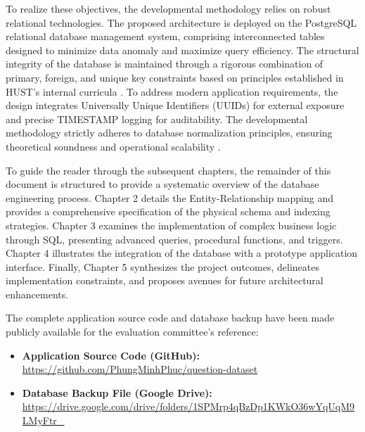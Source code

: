 \documentclass[../report_main.tex]{subfiles}
\begin{document}
To realize these objectives, the developmental methodology relies on robust relational technologies. The proposed architecture is deployed on the PostgreSQL \cite{postgresql2023} relational database management system, comprising interconnected tables designed to minimize data anomaly and maximize query efficiency. The structural integrity of the database is maintained through a rigorous combination of primary, foreign, and unique key constraints based on principles established in \gls{HUST}'s internal curricula \cite{hust_db_slides}. To address modern application requirements, the design integrates Universally Unique Identifiers (UUIDs) for external exposure and precise TIMESTAMP logging for auditability. The developmental methodology strictly adheres to database normalization principles, ensuring theoretical soundness and operational scalability \cite{uet_db_slides}.

To guide the reader through the subsequent chapters, the remainder of this document is structured to provide a systematic overview of the database engineering process. Chapter 2 details the Entity-Relationship mapping and provides a comprehensive specification of the physical schema and indexing strategies. Chapter 3 examines the implementation of complex business logic through SQL, presenting advanced queries, procedural functions, and triggers. Chapter 4 illustrates the integration of the database with a prototype application interface. Finally, Chapter 5 synthesizes the project outcomes, delineates implementation constraints, and proposes avenues for future architectural enhancements.

\vspace{0.5cm}
\begin{tcolorbox}[colback=white, colframe=black!70, boxrule=0.5pt, arc=2pt, fonttitle=\bfseries, title=Project Resources]
The complete application source code and database backup have been made publicly available for the evaluation committee's reference:

\begin{itemize}
    \item \textbf{Application Source Code (GitHub):} \url{https://github.com/PhungMinhPhuc/question-dataset}
    \item \textbf{Database Backup File (Google Drive):} \url{https://drive.google.com/drive/folders/1SPMrp4qBzDp1KWkO36wYqUqM9LMyFtr_}
\end{itemize}
\end{tcolorbox}
\end{document}

